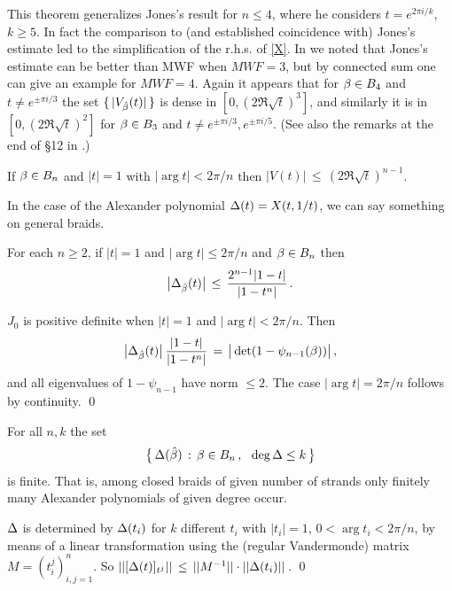 This theorem generalizes Jones's result \cite[proposition 15.3]{Jones}
for $n\le 4$, where he considers $t=e^{2\pi i/k}$, $k\ge 5$. In fact
the comparison to (and established coincidence with) Jones's
estimate led to the simplification of the r.h.s. of \eqref{X}.
In \cite{posex_bcr} we noted that Jones's estimate can be
better than MWF when $MWF=3$, but by connected sum one
can give an example for $MWF=4$. Again it appears that for
$\beta\in B_4$ and $t\ne e^{\pm \pi i/3}$ the set $\{\,|V_{\hat
{\beta}}(t)|\,\}$ is dense in $[0,(2\Re \sqrt{t})^3]$, and similarly it
is in $[0,(2\Re \sqrt{t})^2]$ for $\beta\in B_3$ and $t\ne e^{\pm \pi
i/3},e^{\pm \pi i/5}$. (See also the remarks at the end of \S 12
in \cite{Jones}.)

\begin{conjecture}
If $\beta\in B_n$ and $|t|=1$ with $|\arg t|<2\pi /n$ then
$|V(t)|\,\le\,(2\Re \sqrt{t})^{n-1}$.
\end{conjecture}

In the case of the Alexander polynomial $\Delta(t)=X(t,1/t)$, we
can say something on general braids.

\begin{theorem}
For each $n\ge 2$, %
if $|t|=1$ and $|\arg t|\le 2\pi/n$ and $\beta\in B_n$ then
\[
\big |\Delta_{\hat{\beta}}(t)\big|\,\le\,\frac{2^{n-1}|1-t|}{|1-t^n|}\,.
\]
\end{theorem}

\proof
$J_0$ is positive definite when $|t|=1$ and $|\arg t|<2\pi/n$.
Then
\[
\big |\Delta_{\hat{\beta}}(t)\big|\,\frac{|1-t|}{|1-t^n|}\,=\,
\big |\det (1-\psi_{n-1}(\beta))\big|\,,
\]
and all eigenvalues of $1-\psi_{n-1}$ have norm $\le 2$.
The case $|\arg t|=2\pi/n$ follows by continuity. \qed

\begin{corr}
For all $n,k$ the set
\[
\big\{\,\Delta(\hat{\beta})\,:\,\beta\in B_n\,,\ \ \deg\Delta\le k\,\big\}
\]
is finite. That is, among closed braids of given number of strands
only finitely many Alexander polynomials of given degree occur.
\end{corr}

\proof $\Delta$ is determined by $\Delta(t_i)$ for $k$ different
$t_i$ with $|t_i|=1$, $0<\arg t_i<2\pi/n$, by means of a 
linear transformation using the (regular Vandermonde)
matrix $M=(t_i^j)_{i,j=1}^n$.
So $||[\Delta(t)]_{t^j}||\,\le\,||M^{-1}||\cdot ||\Delta(t_i)||$\,.
\qed


